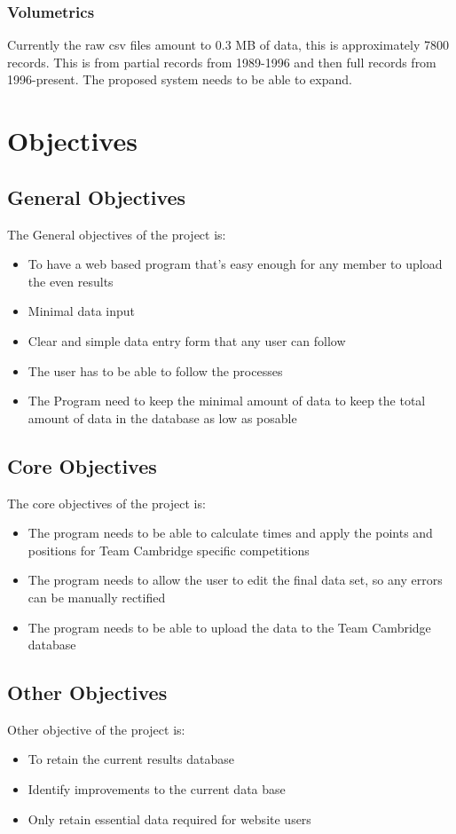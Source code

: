 \subsubsection{Volumetrics}
Currently the raw csv files amount to 0.3 MB of data, this is approximately 7800 records. This is from partial records from 1989-1996 and then full records from 1996-present. The proposed system needs to be able to expand.
\section{Objectives}

\subsection{General Objectives}
The General objectives of the project is:
\begin{itemize}
	\item To have a web based program that's easy enough for any member to upload the even results
	\item Minimal data input
	\item Clear and simple data entry form that any user can follow
	\item The user has to be able to follow the processes
	\item The Program need to keep the minimal amount of data to keep the total amount of data in the database as low as posable
\end{itemize}

\subsection{Core Objectives}
The core objectives of the project is:
\begin{itemize}
	\item The program needs to be able to calculate times and apply the points and positions for Team Cambridge specific competitions
	\item The program needs to allow the user to edit the final data set, so any errors can be manually rectified
	\item The program needs to be able to upload the data to the Team Cambridge database
\end{itemize}
\subsection{Other Objectives}
Other objective of the project is:
\begin{itemize}
	\item To retain the current results database
	\item Identify improvements to the current data base
	\item Only retain essential data required for website users 
\end{itemize}
